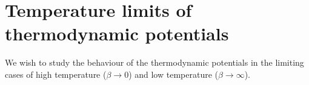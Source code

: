 \documentclass[letterpaper,english,10pt]{article}
\begin{document}
%
\section{Temperature limits of thermodynamic potentials}
We wish to study the behaviour of the thermodynamic potentials in the limiting cases of high temperature ($\beta \to 0$) and low temperature ($\beta \to \infty$).
\end{document}
